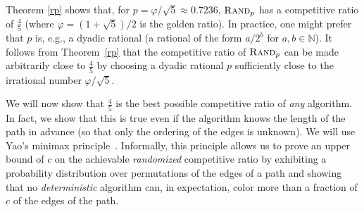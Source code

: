 \documentclass[smallextended]{svjour3}
\newcommand{\RP}{\ensuremath{\operatorname{\textsc{Rand}}}\xspace}
\begin{document}
Theorem \ref{rp} shows that, for $p=\varphi/\sqrt{5}\approx 0.7236$, $\RP_p$ has a
 competitive ratio of $\frac45$ (where $\varphi=(1+\sqrt{5})/2$ is the golden ratio). In practice, one might prefer that $p$ is, e.g., a dyadic rational (a rational of the form $a/2^b$ for $a,b\in\mathbb{N}$). It follows from Theorem~\ref{rp} that the competitive ratio of $\RP_p$ can be made arbitrarily close to $\frac45$ by choosing a dyadic rational $p$ sufficiently close to the irrational number $\varphi/\sqrt{5}$.

We will now show that $\frac45$ is the best possible competitive ratio of \emph{any} algorithm. In fact, we show that this is true even if the algorithm knows the length of the path in advance (so that only the ordering of the edges is unknown). We will use Yao's minimax principle~\cite{Yao,BE98b}. Informally, this principle allows us to prove an upper bound of $c$ on the achievable \emph{randomized} competitive ratio by exhibiting a probability distribution over permutations of the edges of a path and showing that no \emph{deterministic} algorithm can, in expectation, color more than a fraction of $c$ of the edges of the path.
\end{document}
